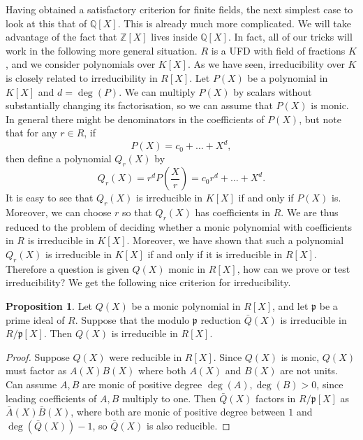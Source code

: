 \documentclass{article}
\newcommand{\Z}{\mathbb{Z}}
\newcommand{\Q}{\mathbb{Q}}
\newcommand{\rb}[1]{\left( #1 \right)}
\renewcommand{\sb}[1]{\left[ #1 \right]}
\theoremstyle{definition}\newtheorem{definition}{Definition}[subsection]
\theoremstyle{definition}\newtheorem{remark}[definition]{Remark}
\theoremstyle{definition}\newtheorem*{example}{Example}
\theoremstyle{definition}\newtheorem*{note}{Note}
\newtheorem{proposition}[definition]{Proposition}
\begin{document}
Having obtained a satisfactory criterion for finite fields, the next simplest case to look at this that of $ \Q\sb{X} $. This is already much more complicated. We will take advantage of the fact that $ \Z\sb{X} $ lives inside $ \Q\sb{X} $. In fact, all of our tricks will work in the following more general situation. $ R $ is a UFD with field of fractions $ K $, and we consider polynomials over $ K\sb{X} $. As we have seen, irreducibility over $ K $ is closely related to irreducibility in $ R\sb{X} $. Let $ P\rb{X} $ be a polynomial in $ K\sb{X} $ and $ d = \deg\rb{P} $. We can multiply $ P\rb{X} $ by scalars without substantially changing its factorisation, so we can assume that $ P\rb{X} $ is monic. In general there might be denominators in the coefficients of $ P\rb{X} $, but note that for any $ r \in R $, if
$$ P\rb{X} = c_0 + \dots + X^d, $$
then define a polynomial $ Q_r\rb{X} $ by
$$ Q_r\rb{X} = r^dP\rb{\dfrac{X}{r}} = c_0r^d + \dots + X^d. $$
It is easy to see that $ Q_r\rb{X} $ is irreducible in $ K\sb{X} $ if and only if $ P\rb{X} $ is. Moreover, we can choose $ r $ so that $ Q_r\rb{X} $ has coefficients in $ R $. We are thus reduced to the problem of deciding whether a monic polynomial with coefficients in $ R $ is irreducible in $ K\sb{X} $. Moreover, we have shown that such a polynomial $ Q_r\rb{X} $ is irreducible in $ K\sb{X} $ if and only if it is irreducible in $ R\sb{X} $. Therefore a question is given $ Q\rb{X} $ monic in $ R\sb{X} $, how can we prove or test irreducibility? We get the following nice criterion for irreducibility.

\begin{proposition}
Let $ Q\rb{X} $ be a monic polynomial in $ R\sb{X} $, and let $ \mathfrak{p} $ be a prime ideal of $ R $. Suppose that the modulo $ \mathfrak{p} $ reduction $ \bar{Q}\rb{X} $ is irreducible in $ R / \mathfrak{p}\sb{X} $. Then $ Q\rb{X} $ is irreducible in $ R\sb{X} $.
\end{proposition}

\begin{proof}
Suppose $ Q\rb{X} $ were reducible in $ R\sb{X} $. Since $ Q\rb{X} $ is monic, $ Q\rb{X} $ must factor as $ A\rb{X}B\rb{X} $ where both $ A\rb{X} $ and $ B\rb{X} $ are not units. Can assume $ A, B $ are monic of positive degree $ \deg\rb{A}, \deg\rb{B} > 0 $, since leading coefficients of $ A, B $ multiply to one. Then $ \bar{Q}\rb{X} $ factors in $ R / \mathfrak{p}\sb{X} $ as $ \bar{A}\rb{X}\bar{B}\rb{X} $, where both are monic of positive degree between $ 1 $ and $ \deg\rb{\bar{Q}\rb{X}} - 1 $, so $ \bar{Q}\rb{X} $ is also reducible.
\end{proof}
\end{document}

